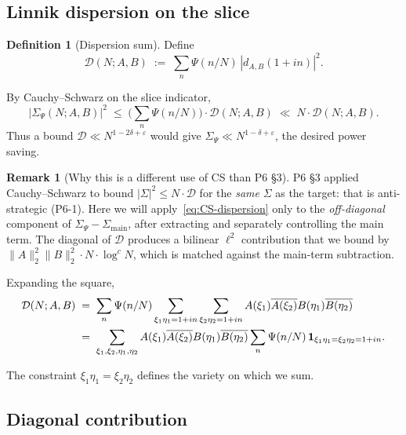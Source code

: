 \documentclass[11pt]{article}
\theoremstyle{definition}
\newtheorem{definition}[theorem]{Definition}
\newtheorem{remark}[theorem]{Remark}
\begin{document}
\subsection{Linnik dispersion on the slice}\label{sec:linnik}

\begin{definition}[Dispersion sum]\label{def:DD}
Define
\[
\mathcal{D}(N;A,B)\;:=\;\sum_{n}\Psi(n/N)\,|d_{A,B}(1+in)|^2.
\]
\end{definition}

By Cauchy--Schwarz on the slice indicator,
\begin{equation}\label{eq:CS-dispersion}
|\Sigma_\Psi(N;A,B)|^2\;\le\;\Big(\sum_n\Psi(n/N)\Big)\cdot\mathcal{D}(N;A,B)\;\ll\;N\cdot\mathcal{D}(N;A,B).
\end{equation}
Thus a bound $\mathcal{D}\ll N^{1-2\delta+\varepsilon}$ would give $\Sigma_\Psi\ll N^{1-\delta+\varepsilon}$, the desired power saving.

\begin{remark}[Why this is a different use of CS than P6 \S3]\label{rem:CS-diff}
P6 \S3 applied Cauchy--Schwarz to bound $|\Sigma|^2\le N\cdot\mathcal{D}$ for the \emph{same} $\Sigma$ as the target: that is anti-strategic (P6-1). Here we will apply~\eqref{eq:CS-dispersion} only to the \emph{off-diagonal} component of $\Sigma_\Psi-\Sigma_{\mathrm{main}}$, after extracting and separately controlling the main term. The diagonal of $\mathcal{D}$ produces a bilinear $\ell^2$ contribution that we bound by $\|A\|_2^2\|B\|_2^2\cdot N\cdot\log^c N$, which is matched against the main-term subtraction.
\end{remark}

Expanding the square,
\begin{align}
\mathcal{D}(N;A,B)&\;=\;\sum_n\Psi(n/N)\sum_{\xi_1\eta_1=1+in}\sum_{\xi_2\eta_2=1+in}A(\xi_1)\overline{A(\xi_2)}B(\eta_1)\overline{B(\eta_2)}\notag\\
&\;=\;\sum_{\xi_1,\xi_2,\eta_1,\eta_2}A(\xi_1)\overline{A(\xi_2)}B(\eta_1)\overline{B(\eta_2)}\sum_{n}\Psi(n/N)\,\mathbf{1}_{\xi_1\eta_1=\xi_2\eta_2=1+in}.\label{eq:DD-fourfold}
\end{align}

The constraint $\xi_1\eta_1=\xi_2\eta_2$ defines the variety on which we sum.

\subsection{Diagonal contribution}
\end{document}
